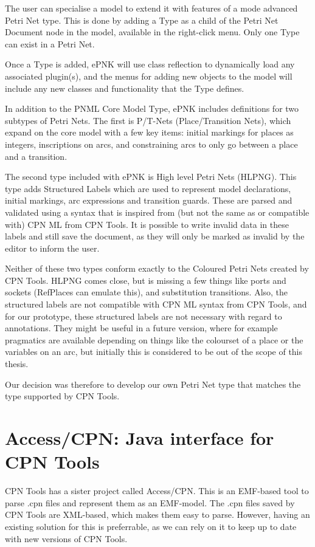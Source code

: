 The user can specialise a model to extend it with features of a mode advanced
Petri Net type. This is done by adding a Type as a child of the Petri Net
Document node in the model, available in the right-click menu. Only one
Type can exist in a Petri Net.

Once a Type is added, ePNK will use class reflection to dynamically load
any associated plugin(s), and the menus for adding new objects to the model will
include any new classes and functionality that the Type defines.

In addition to the PNML Core Model Type, ePNK includes definitions for
two subtypes of Petri Nets. The first is P/T-Nets (Place/Transition Nets), which
expand on the core model with a few key items: initial markings for places as
integers, inscriptions on arcs, and constraining arcs to only go between a place
and a transition.

The second type included with ePNK is High level Petri Nets (HLPNG). This type
adds Structured Labels which are used to represent model declarations, initial
markings, arc expressions and transition guards.
These are parsed and validated using a syntax that is inspired from (but not the
same as or compatible with) CPN ML from CPN Tools. It is possible to write
invalid data in these labels and still save the document, as they will only be
marked as invalid by the editor to inform the user.

Neither of these two types conform exactly to the Coloured Petri Nets created by
CPN Tools. HLPNG comes close, but is missing a few things like ports and sockets
(RefPlaces can emulate this), and substitution transitions. Also, the
structured labels are not compatible with CPN ML syntax from CPN Tools, and for
our prototype, these structured labels are not necessary with regard to
annotations. They might be useful in a future version, where for example
pragmatics are available depending on things like the colourset of a place or the
variables on an arc, but initially this is considered to be out of the scope of
this thesis.

Our decision was therefore to develop our own Petri Net type that matches the
type supported by CPN Tools.

\section{Access/CPN: Java interface for CPN Tools}
CPN Tools has a sister project called Access/CPN. This is an
EMF-based tool to parse .cpn files and represent them as an
EMF-model. The .cpn files saved by CPN Tools are XML-based, which makes them
easy to parse. However, having an existing solution for this is preferrable, as
we can rely on it to keep up to date with new versions of CPN Tools.

